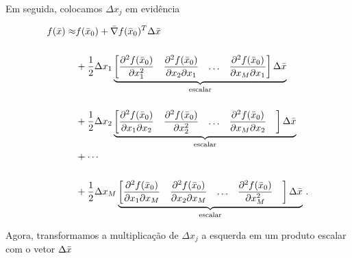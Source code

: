 \noindent Em seguida, colocamos $\Delta x_j$ em evidência

\begin{equation}
\begin{split}
f(\bar{x}) \approx
&f(\bar{x}_0) + \bar{\nabla}f(\bar{x}_0)^T\Delta\bar{x}\
\\[0.5cm]
&+ \dfrac{1}{2}\Delta x_1
\underbrace{
\begin{bmatrix}
\dfrac{\partial^2 f(\bar{x}_0)}{\partial x_1^2} &
\dfrac{\partial^2 f(\bar{x}_0)}{\partial x_2\partial x_1} &
\ldots &
\dfrac{\partial^2 f(\bar{x}_0)}{\partial x_M\partial x_1}
\end{bmatrix}
\Delta\bar{x}}_{\text{escalar}}
\\[0.5cm]
&+ \dfrac{1}{2}\Delta x_2
\underbrace{
\begin{bmatrix}
\dfrac{\partial^2 f(\bar{x}_0)}{\partial x_1\partial x_2} &
\dfrac{\partial^2 f(\bar{x}_0)}{\partial x_2^2} &
\ldots &
\dfrac{\partial^2 f(\bar{x}_0)}{\partial x_M\partial x_2} &
\end{bmatrix}
\Delta\bar{x}}_{\text{escalar}}
\\
&+ \dotsb
\\[0.5cm]
&+ \dfrac{1}{2}\Delta x_M
\underbrace{
\begin{bmatrix}
\dfrac{\partial^2 f(\bar{x}_0)}{\partial x_1\partial x_M} &
\dfrac{\partial^2 f(\bar{x}_0)}{\partial x_2\partial x_M} &
\ldots &
\dfrac{\partial^2 f(\bar{x}_0)}{\partial x_M^2} &
\end{bmatrix}
\Delta\bar{x}}_{\text{escalar}}
\thinspace .
\end{split}
\end{equation}

\noindent Agora, transformamos a multiplicação de $\Delta x_j$ a esquerda
em um produto escalar com o vetor $\Delta\bar{x}$

